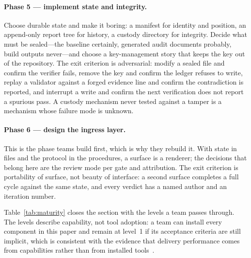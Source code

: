 \documentclass[10pt,a4paper]{article}
\theoremstyle{definition}
\theoremstyle{plain}
\theoremstyle{principle}
\begin{document}
\paragraph{Phase 5 --- implement state and integrity.} Choose durable state and make it boring: a
manifest for identity and position, an append-only report tree for history, a custody directory for
integrity. Decide what must be sealed---the baseline certainly, generated audit documents probably,
build outputs never---and choose a key-management story that keeps the key out of the repository.
The exit criterion is adversarial: modify a sealed file and confirm the verifier fails, remove the
key and confirm the ledger refuses to write, replay a validator against a forged evidence line and
confirm the contradiction is reported, and interrupt a write and confirm the next verification does
not report a spurious pass. A custody mechanism never tested against a tamper is a mechanism
whose failure mode is unknown.

\paragraph{Phase 6 --- design the ingress layer.} This is the phase teams build first, which is why
they rebuild it. With state in files and the protocol in the procedures, a surface is a renderer;
the decisions that belong here are the review mode per gate and attribution. The exit criterion is
portability of surface, not beauty of interface: a second surface completes a full cycle against
the same state, and every verdict has a named author and an iteration number.

Table~\ref{tab:maturity} closes the section with the levels a team passes through. The levels
describe capability, not tool adoption: a team can install every component in this paper and remain
at level~1 if its acceptance criteria are still implicit, which is consistent with the evidence
that delivery performance comes from capabilities rather than from installed
tools~\cite{forsgren2018}.
\end{document}
